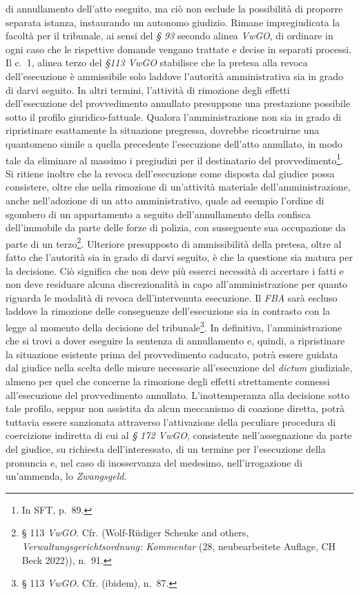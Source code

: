 \documentclass[12pt,it,a4paper,]{report}
\begin{document}
di annullamento dell'atto eseguito, ma ciò non esclude la possibilità di
proporre separata istanza, instaurando un autonomo giudizio. Rimane
impregiudicata la facoltà per il tribunale, ai sensi del \emph{§ 93}
secondo alinea \emph{VwGO}, di ordinare in ogni caso che le rispettive
domande vengano trattate e decise in separati processi. Il c.~1, alinea
terzo del \emph{§113 VwGO} stabilisce che la pretesa alla revoca
dell'esecuzione è ammissibile solo laddove l'autorità amministrativa sia
in grado di darvi seguito. In altri termini, l'attività di rimozione
degli effetti dell'esecuzione del provvedimento annullato presuppone una
prestazione possibile sotto il profilo giuridico-fattuale. Qualora
l'amministrazione non sia in grado di ripristinare esattamente la
situazione pregressa, dovrebbe ricostruirne una quantomeno simile a
quella precedente l'esecuzione dell'atto annullato, in modo tale da
eliminare al massimo i pregiudizi per il destinatario del
provvedimento\footnote{In SFT, p.~89.}. Si ritiene inoltre che la revoca
dell'esecuzione come disposta dal giudice possa consistere, oltre che
nella rimozione di un'attività materiale dell'amministrazione, anche
nell'adozione di un atto amministrativo, quale ad esempio l'ordine di
sgombero di un appartamento a seguito dell'annullamento della confisca
dell'immobile da parte delle forze di polizia, con susseguente sua
occupazione da parte di un terzo\footnote{§ 113 \emph{VwGO}. Cfr.
  (Wolf-Rüdiger Schenke and others, \emph{Verwaltungsgerichtsordnung:
  Kommentar} (28, neubearbeitete Auflage, CH Beck 2022)), n.~91.}.
Ulteriore presupposto di ammissibilità della pretesa, oltre al fatto che
l'autorità sia in grado di darvi seguito, è che la questione sia matura
per la decisione. Ciò significa che non deve più esserci necessità di
accertare i fatti e non deve residuare alcuna discrezionalità in capo
all'amministrazione per quanto riguarda le modalità di revoca
dell'intervenuta esecuzione. Il \emph{FBA} sarà escluso laddove la
rimozione delle conseguenze dell'esecuzione sia in contrasto con la
legge al momento della decisione del tribunale\footnote{§ 113
  \emph{VwGO}. Cfr. (ibidem), n.~87.}. In definitiva, l'amministrazione
che si trovi a dover eseguire la sentenza di annullamento e, quindi, a
ripristinare la situazione esistente prima del provvedimento caducato,
potrà essere guidata dal giudice nella scelta delle misure necessarie
all'esecuzione del \emph{dictum} giudiziale, almeno per quel che
concerne la rimozione degli effetti strettamente connessi all'esecuzione
del provvedimento annullato. L'inottemperanza alla decisione sotto tale
profilo, seppur non assistita da alcun meccanismo di coazione diretta,
potrà tuttavia essere sanzionata attraverso l'attivazione della
peculiare procedura di coercizione indiretta di cui al \emph{§ 172
VwGO}, consistente nell'assegnazione da parte del giudice, su richiesta
dell'interessato, di un termine per l'esecuzione della pronuncia e, nel
caso di inosservanza del medesimo, nell'irrogazione di un'ammenda, lo
\emph{Zwangsgeld}.
\end{document}
